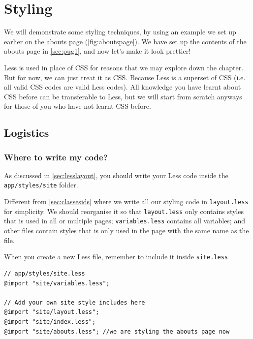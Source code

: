 \chapter{Styling}
\label{sec:styling}

We will demonstrate some styling techniques, by using an example we set up earlier on the abouts page (\cref{fig:aboutspage}). We have set up the contents of the abouts page in \cref{sec:pug1}, and now let's make it look prettier!
\vspace{6mm}

Less is used in place of CSS for reasons that we may explore down the chapter. But for now, we can just treat it as CSS. Because Less is a superset of CSS (i.e. all valid CSS codes are valid Less codes). All knowledge you have learnt about CSS before can be transferable to Less, but we will start from scratch anyways for those of you who have not learnt CSS before.


\section{Logistics}

\subsection*{Where to write my code?}

As discussed in \cref{sec:lesslayout}, you should write your Less code inside the \texttt{app/styles/site} folder. 
\vspace{6mm}

Different from \cref{sec:classesids} where we write all our styling code in \texttt{layout.less} for simplicity. We should reorganise it so that \texttt{layout.less} only contains styles that is used in all or multiple pages; \texttt{variables.less} contains all variables; and other files contain styles that is only used in the page with the same name as the file.

When you create a new Less file, remember to include it inside \texttt{site.less}

\begin{lstlisting}
// app/styles/site.less
@import "site/variables.less";

// Add your own site style includes here
@import "site/layout.less";
@import "site/index.less";
@import "site/abouts.less"; //we are styling the abouts page now
\end{lstlisting}

